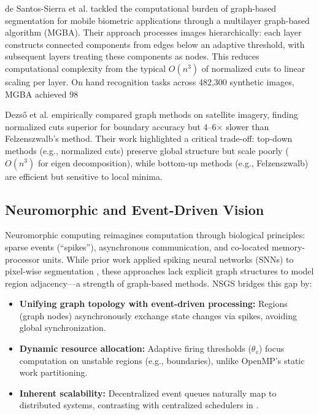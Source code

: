 \documentclass[conference]{IEEEtran}
\begin{document}
de Santos-Sierra et al. \cite{Santos2014} tackled the computational burden of graph-based segmentation for mobile biometric applications through a multilayer graph-based algorithm (MGBA). Their approach processes images hierarchically: each layer constructs connected components from edges below an adaptive threshold, with subsequent layers treating these components as nodes. This reduces computational complexity from the typical $O(n^3)$ of normalized cuts to linear scaling per layer. On hand recognition tasks across 482,300 synthetic images, MGBA achieved 98%

Dezső et al. \cite{Dezso2012} empirically compared graph methods on satellite imagery, finding normalized cuts \cite{Shi2000} superior for boundary accuracy but 4–6× slower than Felzenszwalb's method. Their work highlighted a critical trade-off: top-down methods (e.g., normalized cuts) preserve global structure but scale poorly ($O(n^3)$ for eigen decomposition), while bottom-up methods (e.g., Felzenszwalb) are efficient but sensitive to local minima.

\subsection{Neuromorphic and Event-Driven Vision}
Neuromorphic computing reimagines computation through biological principles: sparse events (``spikes''), asynchronous communication, and co-located memory-processor units. While prior work applied spiking neural networks (SNNs) to pixel-wise segmentation \cite{Maass1997, Ha2016, Bartolozzi2022}, these approaches lack explicit graph structures to model region adjacency—a strength of graph-based methods. NSGS bridges this gap by:

\begin{itemize}
    \item \textbf{Unifying graph topology with event-driven processing:} Regions (graph nodes) asynchronously exchange state changes via spikes, avoiding global synchronization.
    \item \textbf{Dynamic resource allocation:} Adaptive firing thresholds ($\theta_v$) focus computation on unstable regions (e.g., boundaries), unlike OpenMP's static work partitioning.
    \item \textbf{Inherent scalability:} Decentralized event queues naturally map to distributed systems, contrasting with centralized schedulers in \cite{Saglam2016}.
\end{itemize}
\end{document}
